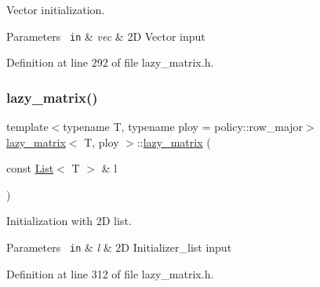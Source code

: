 Vector initialization. 


\begin{DoxyParams}[1]{Parameters}
\mbox{\texttt{ in}}  & {\em vec} & 2D Vector input \\
\hline
\end{DoxyParams}


Definition at line 292 of file lazy\+\_\+matrix.\+h.

\mbox{\label{classlazy__matrix_aec8178a41ca97d895e1e20dbed365d02}} 
\subsubsection{\texorpdfstring{lazy\_matrix()}{lazy\_matrix()}\hspace{0.1cm}{\footnotesize\ttfamily [5/6]}}
{\footnotesize\ttfamily template$<$typename T, typename ploy = policy\+::row\+\_\+major$>$ \\
\mbox{\hyperlink{classlazy__matrix}{lazy\+\_\+matrix}}$<$ T, ploy $>$\+::\mbox{\hyperlink{classlazy__matrix}{lazy\+\_\+matrix}} (\begin{DoxyParamCaption}\item[{const \mbox{\hyperlink{lazy__matrix_8h_a9421479667ba20cc5361aa756ae056d7}{List}}$<$ T $>$ \&}]{l }\end{DoxyParamCaption})\hspace{0.3cm}{\ttfamily [inline]}}



Initialization with 2D list. 


\begin{DoxyParams}[1]{Parameters}
\mbox{\texttt{ in}}  & {\em l} & 2D Initializer\+\_\+list input \\
\hline
\end{DoxyParams}


Definition at line 312 of file lazy\+\_\+matrix.\+h.

\mbox{\label{classlazy__matrix_a7f5897589a5a5dd07ccdf73794e81d95}} 
